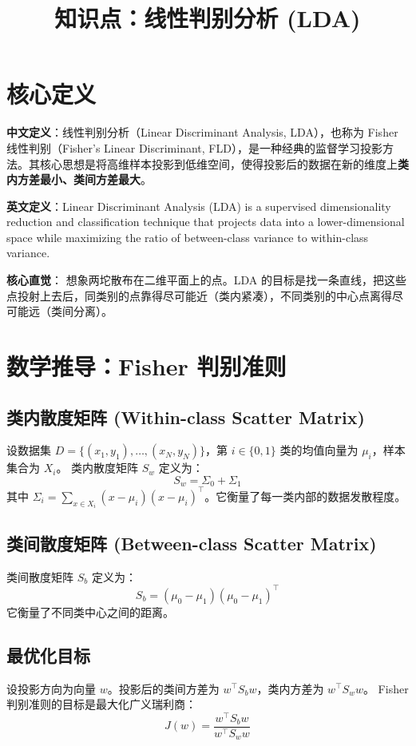 \documentclass[12pt, a4paper]{article}
\title{知识点：线性判别分析 (LDA)}
\author{}
\date{}
\begin{document}
\maketitle

\section{核心定义}
\textbf{中文定义}：线性判别分析（Linear Discriminant Analysis, LDA），也称为 Fisher 线性判别（Fisher's Linear Discriminant, FLD），是一种经典的监督学习投影方法。其核心思想是将高维样本投影到低维空间，使得投影后的数据在新的维度上\textbf{类内方差最小、类间方差最大}。

\textbf{英文定义}：Linear Discriminant Analysis (LDA) is a supervised dimensionality reduction and classification technique that projects data into a lower-dimensional space while maximizing the ratio of between-class variance to within-class variance.

\textbf{核心直觉}：
想象两坨散布在二维平面上的点。LDA 的目标是找一条直线，把这些点投射上去后，同类别的点靠得尽可能近（类内紧凑），不同类别的中心点离得尽可能远（类间分离）。

\section{数学推导：Fisher 判别准则}

\subsection{类内散度矩阵 (Within-class Scatter Matrix)}
设数据集 $D = \{(x_1, y_1), \dots, (x_N, y_N)\}$，第 $i \in \{0, 1\}$ 类的均值向量为 $\mu_i$，样本集合为 $X_i$。
类内散度矩阵 $S_w$ 定义为：
$$ S_w = \Sigma_0 + \Sigma_1 $$
其中 $\Sigma_i = \sum_{x \in X_i} (x - \mu_i)(x - \mu_i)^\top$。它衡量了每一类内部的数据发散程度。

\subsection{类间散度矩阵 (Between-class Scatter Matrix)}
类间散度矩阵 $S_b$ 定义为：
$$ S_b = (\mu_0 - \mu_1)(\mu_0 - \mu_1)^\top $$
它衡量了不同类中心之间的距离。

\subsection{最优化目标}
设投影方向为向量 $w$。投影后的类间方差为 $w^\top S_b w$，类内方差为 $w^\top S_w w$。
Fisher 判别准则的目标是最大化广义瑞利商：
$$ J(w) = \frac{w^\top S_b w}{w^\top S_w w} $$
\end{document}
